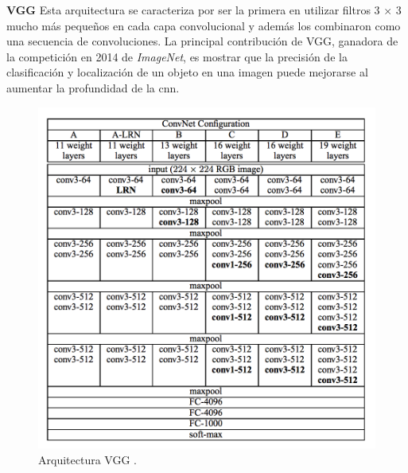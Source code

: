\par \textbf{VGG} \citep{vgg} Esta arquitectura se caracteriza por ser la primera en utilizar filtros 3 × 3 mucho más pequeños en cada capa convolucional y además los combinaron como una secuencia de convoluciones. La principal contribución de VGG, ganadora de la competición en 2014 de \textit{ImageNet}, es mostrar que la precisión de la clasificación y localización de un objeto en una imagen puede mejorarse al aumentar la profundidad de la \ac{cnn}.

\begin{figure}[H]
 \centering
  \includegraphics[scale=0.6,keepaspectratio=true,clip=true]{imagenes/MarcoTeorico/vgg.png}
  \caption{Arquitectura VGG \citep{vgg}.}
	\label{Fig:vgg}
\end{figure}

